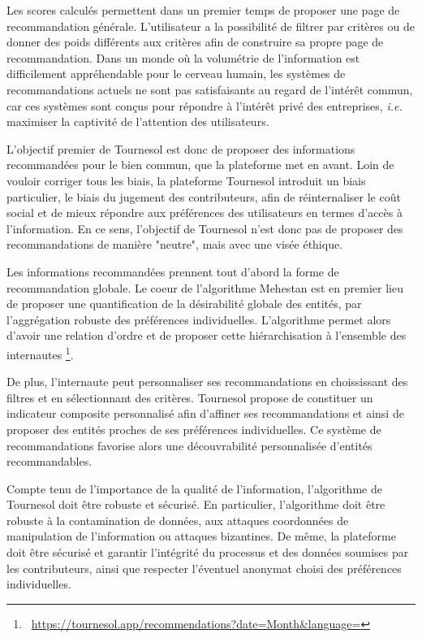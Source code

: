 Les scores calculés permettent dans un premier temps de proposer une page de recommandation générale. L'utilisateur a la possibilité de filtrer par critères ou de donner des poids différents aux critères afin de construire sa propre page de recommandation. Dans un monde où la volumétrie de l'information est difficilement appréhendable pour le cerveau humain, les systèmes de recommandations actuels ne sont pas satisfaisants au regard de l'intérêt commun, car ces systèmes sont conçus pour répondre à l'intérêt privé des entreprises, \textit{i.e.} maximiser la captivité de l'attention des utilisateurs. 

L'objectif premier de Tournesol est donc de proposer des informations recommandées pour le bien commun, que la plateforme met en avant. Loin de vouloir corriger tous les biais, la plateforme Tournesol introduit un biais particulier, le biais du jugement des contributeurs, afin de réinternaliser le coût social et de mieux répondre aux préférences des utilisateurs en termes d'accès à l'information. En ce sens, l'objectif de Tournesol n'est donc pas de proposer des recommandations de manière "neutre", mais avec une visée éthique.

Les informations recommandées prennent tout d'abord la forme de recommandation globale. Le coeur de l'algorithme Mehestan est en premier lieu de proposer une quantification de la désirabilité globale des entités, par l'aggrégation robuste des préférences individuelles. L'algorithme permet alors d'avoir une relation d'ordre et de proposer cette hiérarchisation à l'ensemble des internautes \footnote{~\href{https://tournesol.app/recommendations?date=Month\&language=}{https://tournesol.app/recommendations?date=Month\&language=}}.

De plus, l'internaute peut personnaliser ses recommandations en choississant des filtres et en sélectionnant des critères. Tournesol propose de constituer un indicateur composite personnalisé afin d'affiner ses recommandations et ainsi de proposer des entités proches de ses préférences individuelles. Ce système de recommandations favorise alors une découvrabilité personnalisée d'entités recommandables.

Compte tenu de l'importance de la qualité de l'information, l'algorithme de Tournesol doit être robuste et sécurisé. En particulier, l'algorithme doit être robuste à la contamination de données, aux attaques coordonnées de manipulation de l'information ou attaques bizantines. De même, la plateforme doit être sécurisé et garantir l'intégrité du processus et des données soumises par les contributeurs, ainsi que respecter l'éventuel anonymat choisi des préférences individuelles.


